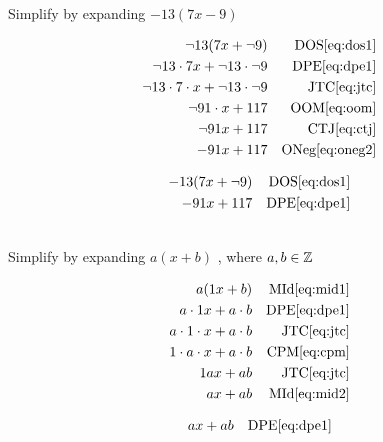 \begin{example}[id:20141109-092651] \label{20141109-092651}  \hfill \\

Simplify by expanding $- 13(7x-9)$

\soln

\solnsteps
\begin{align*}
\neg 13 (7x+\neg 9)  && \text{DOS} \eqref{eq:dos1} \\
\neg 13 \cdot 7x + \neg 13 \cdot \neg 9 && \text{DPE} \eqref{eq:dpe1} \\  
\neg 13 \cdot 7 \cdot x + \neg 13 \cdot \neg 9  && \text{JTC} \eqref{eq:jtc} \\
\neg 91 \cdot x + 117  && \text{OOM} \eqref{eq:oom} \\
\neg 91 x + 117  && \text{CTJ} \eqref{eq:ctj} \\
-91x + 117 && \text{ONeg} \eqref{eq:oneg2} 
\end{align*}

\soln

\lesssteps
\begin{align*}
-13(7x+ \neg 9) && \text{DOS} \eqref{eq:dos1} \\
- 91 x + 117 && \text{DPE} \eqref{eq:dpe1} 
\end{align*}

\end{example}

\begin{example}[id:20141109-092910] \label{20141109-092910}  \hfill \\

Simplify by expanding $a(x+b)$ , where $a, b \in \mathbb{Z}$

\soln

\solnsteps
\begin{align*}
a(1x+b)  && \text{MId} \eqref{eq:mid1} \\
a \cdot 1x + a \cdot b  && \text{DPE} \eqref{eq:dpe1} \\ 
a \cdot 1 \cdot x + a \cdot b  && \text{JTC} \eqref{eq:jtc} \\
1 \cdot a \cdot x + a \cdot b  && \text{CPM} \eqref{eq:cpm} \\ 
1ax + ab  && \text{JTC} \eqref{eq:jtc} \\
ax+ab  && \text{MId} \eqref{eq:mid2} 
\end{align*}

\soln

\lesssteps
\begin{align*}
ax +ab && \text{DPE} \eqref{eq:dpe1} 
\end{align*}
\end{example}

